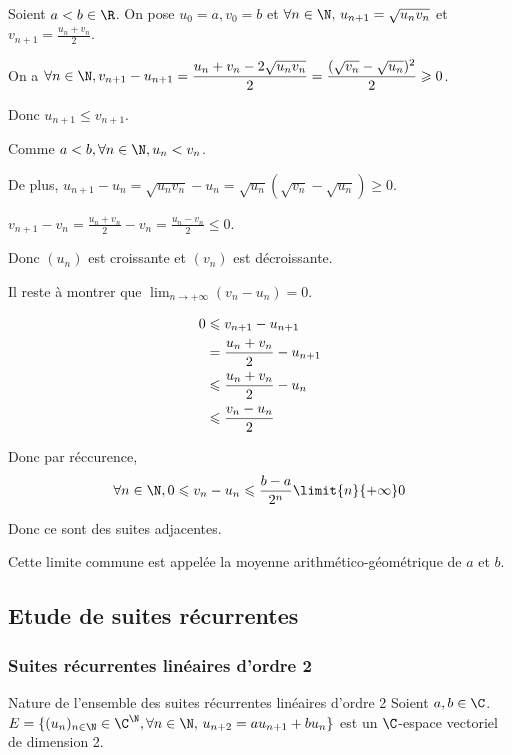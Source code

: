 \begin{exemple}
    Soient $a < b \in \R$. On pose $u_0 = a, v_0 = b$ 
    et $\forall n \in \N, \, u_{n+1} = \sqrt{u_n v_n}$ et $v_{n+1} = \frac{u_n + v_n} 2$.

    On a $\displaystyle \forall n \in \N, v_{n+1} - u_{n+1} = \frac{u_n + v_n -2 \sqrt{u_n v_n}} 2 = \frac{(\sqrt{v_n} - \sqrt{u_n})^2} 2 \geqslant 0$.

    Donc $u_{n + 1} \leqslant v_{n + 1}$.

    Comme $a < b, \forall n \in \N, u_n < v_n$.

    De plus, $u_{n + 1} - u_n = \sqrt{u_n v_n} - u_n = \sqrt{u_n}(\sqrt{v_n} - \sqrt{u_n}) \geqslant 0$.

    $v_{n + 1} - v_n = \frac{u_n + v_n} 2 - v_n = \frac{u_n - v_n} 2 \leqslant 0$.

    Donc $(u_n)$ est croissante et $(v_n)$ est décroissante.

    Il reste à montrer que $\lim_{n \to +\infty} (v_n - u_n) = 0$.

    \begin{align}
        0 & \leqslant  v_{n + 1} - u_{n + 1} \\
        \space & = \frac{u_n + v_n} 2 - u_{n + 1} \\
        \space &  \leqslant \frac{u_n + v_n} 2 - u_n \\
        \space & \leqslant \frac{v_n - u_n} 2 \\
    \end{align}
    

    Donc par réccurence, 
    $$\forall n \in \N, 0 \leqslant v_n - u_n \leqslant \frac{b - a}{2^n} \limit{n}{+ \infty} 0$$

    Donc ce sont des suites adjacentes.

    Cette limite commune est appelée la moyenne arithmético-géométrique de $a$ et $b$.
\end{exemple}

\subsection{Etude de suites récurrentes}
\subsubsection{Suites récurrentes linéaires d'ordre 2}

\begin{propositionnt}{Nature de l'ensemble des suites récurrentes linéaires d'ordre 2}{}
    Soient $a, b \in \C$.  
    $E = \{(u_n)_{n \in \N} \in \C^{\N}, \forall n \in \N, \, u_{n + 2} = a u_{n + 1} + bu_n\}$ est 
    un $\C$-espace vectoriel de dimension 2. 
\end{propositionnt}

